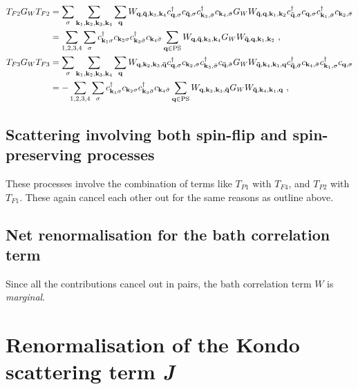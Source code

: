\documentclass{revtex4-2}
\begin{document}
\begin{equation}\begin{aligned}
	T_{F2} G_W T_{F2} &= \sum_\sigma\sum_{{\bf k}_1, {\bf k}_2, {\bf k}_3, {\bf k}_4} \sum_{\bf q}W_{{\bf q},{\bf \bar q},{\bf k}_3,{\bf k}_4} c^\dagger_{{\bf q},\sigma}c_{{\bf \bar q},\sigma}c^\dagger_{{\bf k}_3,\bar\sigma}c_{{\bf k}_4,\bar\sigma} G_W W_{{\bf \bar q},{\bf q},{\bf k}_1,{\bf k}_2} c^\dagger_{{\bf \bar q},\sigma}c_{{\bf q},\sigma}c^\dagger_{{\bf k}_1,\bar\sigma}c_{{\bf k}_2,\bar\sigma} \\
							  &= \sum_{1,2,3,4}\sum_\sigma c^\dagger_{{\bf k}_1\sigma} c_{{\bf k}_2\sigma} c^\dagger_{{\bf k}_3\bar\sigma} c_{{\bf k}_4\bar \sigma} \sum_{\bf q \in \text{PS}} W_{{\bf q},{\bf \bar q},{\bf k}_3,{\bf k}_4} G_W W_{{\bf \bar q},{\bf q},{\bf k}_1,{\bf k}_2}~,\\
	T_{F3} G_W T_{F3} &= \sum_\sigma\sum_{{\bf k}_1, {\bf k}_2, {\bf k}_3, {\bf k}_4} \sum_{\bf q} W_{{\bf q},{\bf k}_2,{\bf k}_3,{\bf \bar q}} c^\dagger_{{\bf q},\sigma}c_{{\bf k}_2,\sigma}c^\dagger_{{\bf k}_3,\bar\sigma}c_{{\bf \bar q},\bar\sigma} G_W W_{{\bf \bar q},{\bf k}_4,{\bf k}_1,{\bf q}} c^\dagger_{{\bf \bar q},\bar\sigma} c_{{\bf k}_4,\bar\sigma} c^\dagger_{{\bf k}_1,\sigma} c_{{\bf q},\sigma} \\
							  &= -\sum_{1,2,3,4}\sum_\sigma c^\dagger_{{\bf k}_1\sigma} c_{{\bf k}_2\sigma} c^\dagger_{{\bf k}_3\bar\sigma} c_{{\bf k}_4\bar \sigma} \sum_{\bf q \in \text{PS}} W_{{\bf q},{\bf k}_2,{\bf k}_3,{\bf \bar q}} G_W W_{{\bf \bar q},{\bf k}_4,{\bf k}_1,{\bf q}}~,
\end{aligned}\end{equation}

\subsection{Scattering involving both spin-flip and spin-preserving processes}
These processes involve the combination of terms like \(T_{P1}\) with \(T_{F4}\), and \(T_{P2}\) with \(T_{F1}\). These again cancel each other out for the same reasons as outline above.

\subsection{Net renormalisation for the bath correlation term}
Since all the contributions cancel out in pairs, the bath correlation term \(W\) is {\it marginal}.

\section{Renormalisation of the Kondo scattering term {\it J}}
\end{document}
